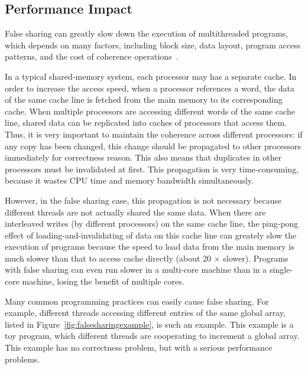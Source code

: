 \subsection{Performance Impact}
\label{falsesharing}
False sharing can greatly slow down the execution of multithreaded programs, which depends on many factors, including block size, data layout, program access patterns, and the cost of coherence operations~\cite{Bolosky:1993:FSE:1295480.1295483}. 

In a typical shared-memory system, each processor may has a separate cache. In order to increase the access speed, when a processor references a word, the data of the same cache line is fetched from the main memory to its corresponding cache. 
When multiple processors are accessing different words of the same cache line, shared data can be replicated into caches of processors that access them. Thus, it is very important to maintain the coherence across different processors: 
if any copy has been changed, this change should be propagated to other processors immediately for correctness reason. This also means that duplicates in other processors must be invalidated at first. This propagation is very time-consuming, because it wastes CPU time and memory bandwidth simultaneously. 

However, in the false sharing case, this propagation is not necessary because different threads are not actually shared the same data. 
When there are interleaved writes (by different processors) on the same cache line, the ping-pong effect of 
loading-and-invalidating of data on this cache line can  
greately slow the execution of programs
because the speed to load data from the main memory is much slower than that to access cache directly
(about 20 $\times$ slower). 
Programs with false sharing can even run slower in a multi-core machine 
than in a single-core machine, losing the benefit of multiple cores.  




Many common programming practices can easily cause false sharing. For example, different threads accessing different entries of the same global array, listed in Figure~\ref{fig:falsesharingexample}, is such an example. This example is a toy program, which different threads are cooperating to increment a global array. This example has no correctness problem, but with a serious performance problems. 


